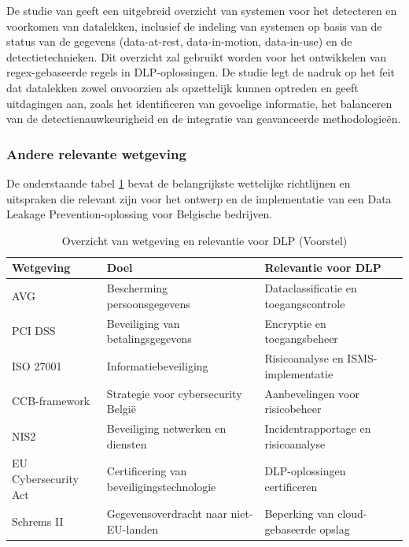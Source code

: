 De studie van \textcite{Nayak2020} geeft een uitgebreid overzicht van systemen voor het detecteren en voorkomen van datalekken, 
inclusief de indeling van systemen op basis van de status van de gegevens (data-at-rest, data-in-motion, dat\-a-in-use) en de detectietechnieken. 
Dit overzicht zal gebruikt worden voor het ontwikkelen van regex-gebaseerde regels in DLP-oploss\-ingen. 
De studie legt de nadruk op het feit dat datalekken zowel onvoorzien als opzettelijk kunnen optreden en geeft uitdagingen aan, 
zoals het identificeren van gevoelige informatie, het balanceren van de detectienauwkeurigheid en de integratie van geavanceerde methodologieën.


\subsubsection{Andere relevante wetgeving}%

De onderstaande tabel \ref{tab:wetgeving_dlp_voorstel} bevat de belangrijkste wettelijke richtlijnen en uitspraken die relevant zijn voor het ontwerp en de implementatie van een Data Leakage Prevention-oplossing voor Belgische bedrijven.


\begin{table}[h]
  \centering
  \small
  \begin{tabular}{p{4cm} p{5cm} p{6cm}}
      \toprule
      \textbf{Wetgeving} & \textbf{Doel} & \textbf{Relevantie voor DLP} \\
      \midrule
      AVG & Bescherming persoonsgegevens & Dataclassificatie en toegangscontrole \\
      PCI DSS & Beveiliging van betalingsgegevens & Encryptie en toegangsbeheer \\
      ISO 27001 & Informatiebeveiliging & Risicoanalyse en ISMS-implementatie \\
      CCB-framework & Strategie voor cybersecurity België & Aanbevelingen voor risicobeheer \\
      NIS2 & Beveiliging netwerken en diensten & Incidentrapportage en risicoanalyse \\
      EU Cybersecurity Act & Certificering van beveiligingstechnologie & DLP-oplossingen certificeren \\
      Schrems II & Gegevensoverdracht naar niet-EU-landen & Beperking van cloud-gebaseerde opslag \\
      \bottomrule
  \end{tabular}
  \caption{Overzicht van wetgeving en relevantie voor DLP (Voorstel)}
  \label{tab:wetgeving_dlp_voorstel}
\end{table}

